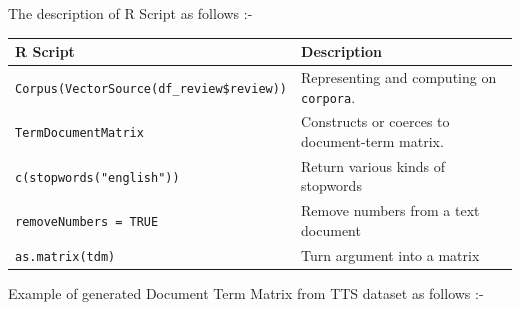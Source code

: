 \documentclass[]{article}
\begin{document}
The description of R Script as follows :-

\begin{longtable}[c]{@{}ll@{}}
\toprule
R Script & Description\tabularnewline
\midrule
\endhead
\texttt{Corpus(VectorSource(df\_review\$review))} & Representing and
computing on \texttt{corpora}.\tabularnewline
\texttt{TermDocumentMatrix} & Constructs or coerces to document-term
matrix.\tabularnewline
\texttt{c(stopwords("english"))} & Return various kinds of
stopwords\tabularnewline
\texttt{removeNumbers\ =\ TRUE} & Remove numbers from a text
document\tabularnewline
\texttt{as.matrix(tdm)} & Turn argument into a matrix\tabularnewline
\bottomrule
\end{longtable}

Example of generated Document Term Matrix from TTS dataset as follows :-
\end{document}
